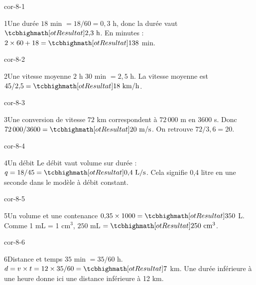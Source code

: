 \clearpage\pagestyle{otMain}\setlength{\otBlocEspacement}{2.5mm}\fontsize{11}{15}\selectfont{}
\begin{blocLivre}{cor-8-1}\begin{corrige}{1}{Une durée}
$18$ min $=18/60=0{,}3$ h, donc la durée vaut $\res{2{,}3\ \mathrm h}$. En minutes : $2\times60+18=\res{138}$ min.
\end{corrige}\end{blocLivre}
\begin{blocLivre}{cor-8-2}\begin{corrige}{2}{Une vitesse moyenne}
$2$ h $30$ min $=2{,}5$ h. La vitesse moyenne est $45/2{,}5=\res{18\ \mathrm{km/h}}$.
\end{corrige}\end{blocLivre}
\begin{blocLivre}{cor-8-3}\begin{corrige}{3}{Une conversion de vitesse}
$72$ km correspondent à $72\,000$ m en 3600 s. Donc $72\,000/3600=\res{20\ \mathrm{m/s}}$. On retrouve $72/3{,}6=20$.
\end{corrige}\end{blocLivre}
\begin{blocLivre}{cor-8-4}\begin{corrige}{4}{Un débit}
Le débit vaut volume sur durée : $q=18/45=\res{0{,}4\ \mathrm{L/s}}$. Cela signifie 0,4 litre en une seconde dans le modèle à débit constant.
\end{corrige}\end{blocLivre}
\begin{blocLivre}{cor-8-5}\begin{corrige}{5}{Un volume et une contenance}
$0{,}35\times1000=\res{350}$ L. Comme 1 mL = 1 cm$^3$, $250$ mL $=\res{250\ \mathrm{cm}^3}$.
\end{corrige}\end{blocLivre}
\begin{blocLivre}{cor-8-6}\begin{corrige}{6}{Distance et temps}
$35$ min $=35/60$ h. $d=v\times t=12\times35/60=\res7$ km. Une durée inférieure à une heure donne ici une distance inférieure à 12 km.
\end{corrige}\end{blocLivre}
